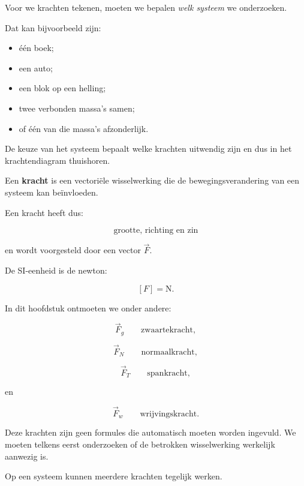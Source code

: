 \documentclass{ximera}
\begin{document}

Voor we krachten tekenen, moeten we bepalen \emph{welk systeem} we
onderzoeken.

Dat kan bijvoorbeeld zijn:

\begin{itemize}
  \item één boek;
  \item een auto;
  \item een blok op een helling;
  \item twee verbonden massa's samen;
  \item of één van die massa's afzonderlijk.
\end{itemize}

De keuze van het systeem bepaalt welke krachten uitwendig zijn en dus
in het krachtendiagram thuishoren.

\begin{definitie}
Een \textbf{kracht} is een vectoriële wisselwerking die de
bewegingsverandering van een systeem kan beïnvloeden.
\end{definitie}

Een kracht heeft dus:

\[
\boxed{\text{grootte, richting en zin}}
\]

en wordt voorgesteld door een vector $\vec F$.

De SI-eenheid is de newton:

\[
[F]=\mathrm N.
\]



In dit hoofdstuk ontmoeten we onder andere:

\[
\vec F_g
\qquad \text{zwaartekracht},
\]

\[
\vec F_N
\qquad \text{normaalkracht},
\]

\[
\vec F_T
\qquad \text{spankracht},
\]

en

\[
\vec F_w
\qquad \text{wrijvingskracht}.
\]

Deze krachten zijn geen formules die automatisch moeten worden ingevuld.
We moeten telkens eerst onderzoeken of de betrokken wisselwerking
werkelijk aanwezig is.




Op een systeem kunnen meerdere krachten tegelijk werken.
\end{document}
